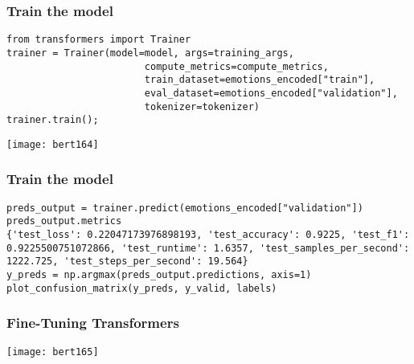 \begin{frame}[fragile]\frametitle{Train the model}

\begin{lstlisting}
from transformers import Trainer
trainer = Trainer(model=model, args=training_args, 
						compute_metrics=compute_metrics,
						train_dataset=emotions_encoded["train"],
						eval_dataset=emotions_encoded["validation"],
						tokenizer=tokenizer)
trainer.train();
\end{lstlisting}
			
			\begin{center}
			\texttt{[image: bert164]}
			\end{center}	
			
\end{frame}


\begin{frame}[fragile]\frametitle{Train the model}

\begin{lstlisting}
preds_output = trainer.predict(emotions_encoded["validation"])
preds_output.metrics
{'test_loss': 0.22047173976898193, 'test_accuracy': 0.9225, 'test_f1': 0.9225500751072866, 'test_runtime': 1.6357, 'test_samples_per_second': 1222.725, 'test_steps_per_second': 19.564}
y_preds = np.argmax(preds_output.predictions, axis=1)
plot_confusion_matrix(y_preds, y_valid, labels)
\end{lstlisting}
			

			
\end{frame}

\begin{frame}[fragile]\frametitle{Fine-Tuning Transformers}

		
			\begin{center}
			\texttt{[image: bert165]}
			\end{center}	
			
\end{frame}

